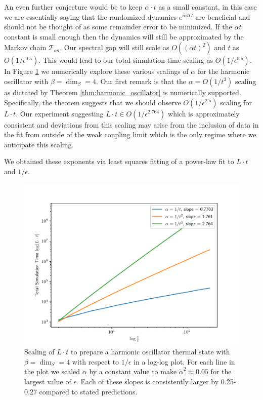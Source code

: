 \documentclass[
 amsmath,amssymb,
 aps,
onecolumn, 
nofootinbib]{revtex4-2}
\newcommand{\TT}{\mathcal{T}}
\newcommand{\bigo}[1]{O\left(#1\right)}
\begin{document}
An even further conjecture would be to keep $\alpha \cdot t$ as a small constant, in this case we are essentially saying that the randomized dynamics $e^{i \alpha t G}$ are beneficial and should not be thought of as some remainder error to be minimized. If the $\alpha t$ constant is small enough then the dynamics will still be approximated by the Markov chain $\TT_{on}$. Our spectral gap will still scale as $\bigo{(\alpha t)^2}$ and $t$ as $\bigo{1/\epsilon^{0.5}}$. This would lead to our total simulation time scaling as $\bigo{1/\epsilon^{0.5}}$. In Figure \ref{fig:epsilon_scaling} we numerically explore these various scalings of $\alpha$ for the harmonic oscillator with $\beta = \dim_S = 4$. Our first remark is that the $\alpha = \bigo{1/t^3}$ scaling as dictated by Theorem \ref{thm:harmonic_oscillator} is numerically supported. 
 Specifically, the theorem suggests that we should observe $O(1/\epsilon^{2.5})$ scaling for $L\cdot t$. 
 Our experiment suggesting $L \cdot t \in \bigo{1/\epsilon^{2.764}}$ which is approximately consistent and deviations from this scaling may arise from the inclusion of data in the fit from outside of the weak coupling limit which is the only regime where we anticipate this scaling. 
 
 We obtained these exponents via least squares fitting of a power-law fit to $L\cdot t$ and $1/\epsilon$. 


\begin{figure}
    \centering
    \includegraphics[width=0.66\linewidth]{numerics/data/epsilon_fitting_4.pdf}
    \caption{Scaling of $L \cdot t$ to prepare a harmonic oscillator thermal state with $\beta = \dim_S = 4$ with respect to $1/\epsilon$ in a log-log plot. For each line in the plot we scaled $\alpha$ by a constant value to make $\widetilde{\alpha}^2 \approx 0.05$ for the largest value of $\epsilon$. Each of these slopes is consistently larger by 0.25-0.27 compared to stated predictions.}
    \label{fig:epsilon_scaling}
\end{figure}
\end{document}
